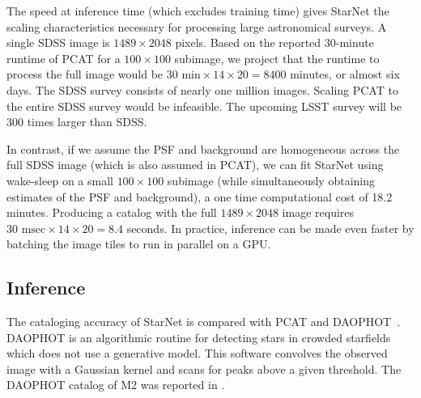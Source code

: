 The speed at inference time (which excludes training time) gives StarNet the scaling characteristics necessary for processing large astronomical surveys. 
A single SDSS image is $1489 \times 2048$ pixels. 
Based on the reported 30-minute runtime of PCAT for a $100\times100$ subimage, we project that
the runtime to process the full image would be $30\text{ min} \times 14 \times 20 = 8400$ minutes, or almost six days. 
The SDSS survey consists of nearly one million images. Scaling PCAT to the entire SDSS survey would be infeasible.
The upcoming LSST survey will be 300 times larger than SDSS.

In contrast, if we assume the PSF and background are homogeneous 
across the full SDSS image (which is also assumed in PCAT), we can 
fit StarNet using wake-sleep 
on a small $100 \times 100$ subimage
(while simultaneously obtaining estimates of the PSF and background),
a one time computational cost of 18.2 minutes. 
Producing a catalog with the full $1489 \times 2048$ image requires
$30\text{ msec} \times 14 \times 20 = 8.4$ seconds. In practice, 
inference can be made even faster by batching the image tiles to run in parallel on a GPU.



\subsection{Inference}
\label{sec:results_on_m2_inference}
The cataloging accuracy of StarNet is compared with PCAT and DAOPHOT~\cite{stetson2987daophot}. 
DAOPHOT is an algorithmic routine for detecting stars in crowded starfields which does not use a generative model. 
This software convolves the observed image with a Gaussian kernel and scans for peaks above a given threshold. 
The DAOPHOT catalog of M2 was reported in \cite{An_2008_m2}. 



